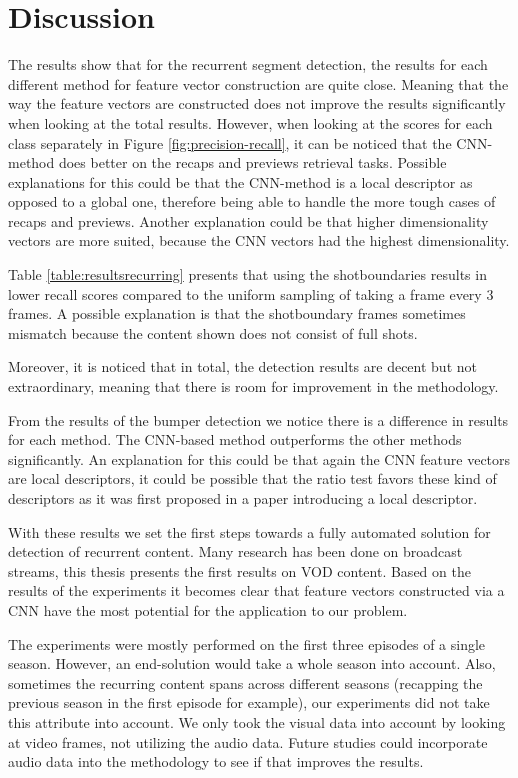 \documentclass{article}
\begin{document}
\section{Discussion} \label{discussion}
The results show that for the recurrent segment detection, the results for each different method for feature vector construction are quite close. Meaning that the way the feature vectors are constructed does not improve the results significantly when looking at the total results. However, when looking at the scores for each class separately in Figure \ref{fig:precision-recall}, it can be noticed that the CNN-method does better on the recaps and previews retrieval tasks. Possible explanations for this could be that the CNN-method is a local descriptor as opposed to a global one, therefore being able to handle the more tough cases of recaps and previews. Another explanation could be that higher dimensionality vectors are more suited, because the CNN vectors had the highest dimensionality.

Table \ref{table:resultsrecurring} presents that using the shotboundaries results in lower recall scores compared to the uniform sampling of taking a frame every 3 frames. A possible explanation is that the shotboundary frames sometimes mismatch because the content shown does not consist of full shots.


Moreover, it is noticed that in total, the detection results are decent but not extraordinary, meaning that there is room for improvement in the methodology. 

From the results of the bumper detection we notice there is a difference in results for each method. The CNN-based method outperforms the other methods significantly. An explanation for this could be that again the CNN feature vectors are local descriptors, it could be possible that the ratio test favors these kind of descriptors as it was first proposed in a paper introducing a local descriptor.

With these results we set the first steps towards a fully automated solution for detection of recurrent content. Many research has been done on broadcast streams, this thesis presents the first results on VOD content. Based on the results of the experiments it becomes clear that feature vectors constructed via a CNN have the most potential for the application to our problem.

The experiments were mostly performed on the first three episodes of a single season. However, an end-solution would take a whole season into account. Also, sometimes the recurring content spans across different seasons (recapping the previous season in the first episode for example), our experiments did not take this attribute into account. We only took the visual data into account by looking at video frames, not utilizing the audio data. Future studies could incorporate audio data into the methodology to see if that improves the results.
\end{document}
